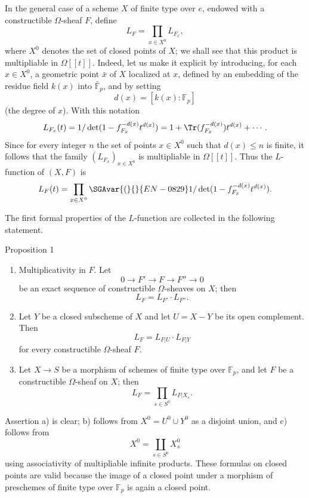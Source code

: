 In the general case of a scheme $X$ of finite type over $e$, endowed with a constructible $\Omega$-sheaf $F$, define
\[
L_F=\prod_{x\in X^0}L_{F_x},
\]
where $X^0$ denotes the set of closed points of $X$; we shall see that this product is multipliable in $\Omega[[t]]$. Indeed, let us make it explicit by introducing, for each $x\in X^0$, a geometric point $\bar x$ of $X$ localized at $x$, defined by an embedding of the residue field $k(x)$ into $\bar{\mathbb F}_p$, and by setting
\[
d(x)=[k(x):\mathbb F_p]
\]
(the degree of $x$). With this notation
\[
L_{F_x}(t)=1/\det(1-f_{F_{\bar x}}^{-d(x)}t^{d(x)})
 =1+\Tr(f_{F_{\bar x}}^{-d(x)})t^{d(x)}+\cdots .
\]
Since for every integer $n$ the set of points $x\in X^0$ such that $d(x)\le n$ is finite, it follows that the family $(L_{F_x})_{x\in X^0}$ is multipliable in $\Omega[[t]]$. Thus the $L$-function of $(X,F)$ is
\[
L_F(t)=\prod_{x\in X^0}\SGAvar{(}{}{EN-0829}1/\det(1-f_{F_{\bar x}}^{-d(x)}t^{d(x)}).
\]

The first formal properties of the $L$-function are collected in the following statement.

\begin{statement}{Proposition 1}
\begin{enumerate}[label=\alph*)]
\item Multiplicativity in $F$. Let
\[
0\longrightarrow F'\longrightarrow F\longrightarrow F''\longrightarrow0
\]
be an exact sequence of constructible $\Omega$-sheaves on $X$; then
\[
L_F=L_{F'}\cdot L_{F''}.
\]
\item Let $Y$ be a closed subscheme of $X$ and let $U=X-Y$ be its open complement. Then
\[
L_F=L_{F|U}\cdot L_{F|Y}
\]
for every constructible $\Omega$-sheaf $F$.
\item Let $X\to S$ be a morphism of schemes of finite type over $\mathbb F_p$, and let $F$ be a constructible $\Omega$-sheaf on $X$; then
\[
L_F=\prod_{s\in S^0}L_{F|X_s}.
\]
\end{enumerate}
\end{statement}

Assertion a) is clear; b) follows from $X^0=U^0\cup Y^0$ as a disjoint union, and c) follows from
\[
X^0=\coprod_{s\in S^0}X_s^0
\]
using associativity of multipliable infinite products. These formulas on closed points are valid because the image of a closed point under a morphism of preschemes of finite type over $\mathbb F_p$ is again a closed point.

